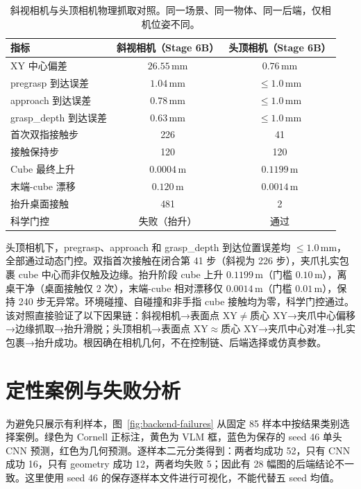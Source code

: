 \documentclass{l4proj}
\begin{document}
\begin{table}[htbp]
  \centering
  \caption{斜视相机与头顶相机物理抓取对照。同一场景、同一物体、同一后端，仅相机位姿不同。}
  \label{tab:overhead-grasp}
  \begin{tabular}{lcc}
    \toprule
    指标 & 斜视相机（Stage 6B） & 头顶相机（Stage 6B） \\
    \midrule
    XY 中心偏差 & $26.55$\,mm & $0.76$\,mm \\
    pregrasp 到达误差 & $1.04$\,mm & $\leq1.0$\,mm \\
    approach 到达误差 & $0.78$\,mm & $\leq1.0$\,mm \\
    grasp\_depth 到达误差 & $0.63$\,mm & $\leq1.0$\,mm \\
    首次双指接触步 & 226 & 41 \\
    接触保持步 & 120 & 120 \\
    Cube 最终上升 & $0.0004$\,m & $0.1199$\,m \\
    末端-cube 漂移 & $0.120$\,m & $0.0014$\,m \\
    抬升桌面接触 & 481 & 2 \\
    科学门控 & 失败（抬升） & 通过 \\
    \bottomrule
  \end{tabular}
\end{table}

头顶相机下，pregrasp、approach 和 grasp\_depth 到达位置误差均 $\leq1.0$\,mm，全部通过动态门控。双指首次接触在闭合第 41 步（斜视为 226 步），夹爪扎实包裹 cube 中心而非仅触及边缘。抬升阶段 cube 上升 $0.1199$\,m（门槛 $0.10$\,m），离桌干净（桌面接触仅 2 次），末端-cube 相对漂移仅 $0.0014$\,m（门槛 $0.01$\,m），保持 240 步无异常。环境碰撞、自碰撞和非手指 cube 接触均为零，科学门控通过。该对照直接验证了以下因果链：斜视相机→表面点 XY$\neq$质心 XY→夹爪中心偏移→边缘抓取→抬升滑脱；头顶相机→表面点 XY$\approx$质心 XY→夹爪中心对准→扎实包裹→抬升成功。根因确在相机几何，不在控制链、后端选择或仿真参数。

\section{定性案例与失败分析}
为避免只展示有利样本，图~\ref{fig:backend-failures} 从固定 85 样本中按结果类别选择案例。绿色为 Cornell 正标注，黄色为 VLM 框，蓝色为保存的 seed 46 单头 CNN 预测，红色为几何预测。逐样本二元分类得到：两者均成功 52，只有 CNN 成功 16，只有 geometry 成功 12，两者均失败 5；因此有 28 幅图的后端结论不一致。这里使用 seed 46 的保存逐样本文件进行可视化，不能代替五 seed 均值。
\end{document}
